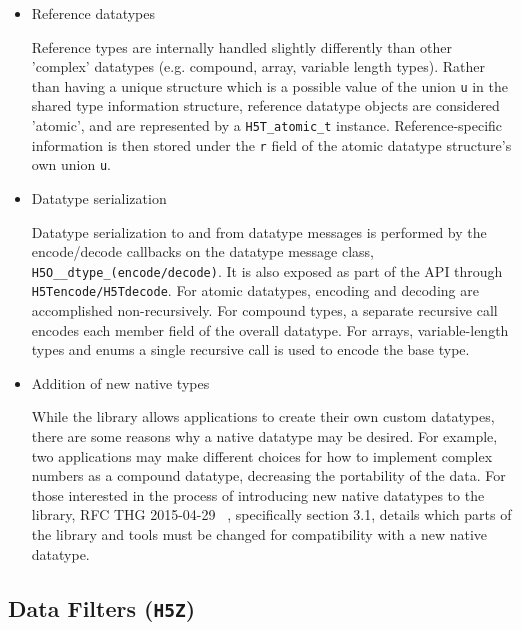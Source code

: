 \begin{itemize}
    \item Reference datatypes

Reference types are internally handled slightly differently than other 'complex' datatypes (e.g. compound, array, variable length types). Rather than having a unique structure which is a possible value of the union \texttt{u} in the shared type information structure, reference datatype objects are considered 'atomic', and are represented by a \texttt{H5T\_atomic\_t} instance. Reference-specific information is then stored under the \texttt{r} field of the atomic datatype structure's own union \texttt{u}.

    \item Datatype serialization

Datatype serialization to and from datatype messages is performed by the encode/decode callbacks on the datatype message class, \texttt{H5O\_\_dtype\_(encode/decode)}. It is also exposed as part of the API through \texttt{H5Tencode/H5Tdecode}. For atomic datatypes, encoding and decoding are accomplished non-recursively. For compound
types, a separate recursive call encodes each member field of the overall datatype. For arrays, variable-length types and enums a single recursive call is used to encode the base type.

    \item Addition of new native types
    
While the library allows applications to create their own custom datatypes, there are some reasons why a native datatype may be desired. For example, two applications may make different choices for how to implement complex numbers as a compound datatype, decreasing the portability of the data. For those interested in the process of introducing new native datatypes to the library, RFC THG 2015-04-29 ~\cite{rfc20150429}, specifically section 3.1, details which parts of the library and tools must be changed for compatibility with a new native datatype.

\end{itemize}

\subsection{Data Filters (\texttt{H5Z})}


